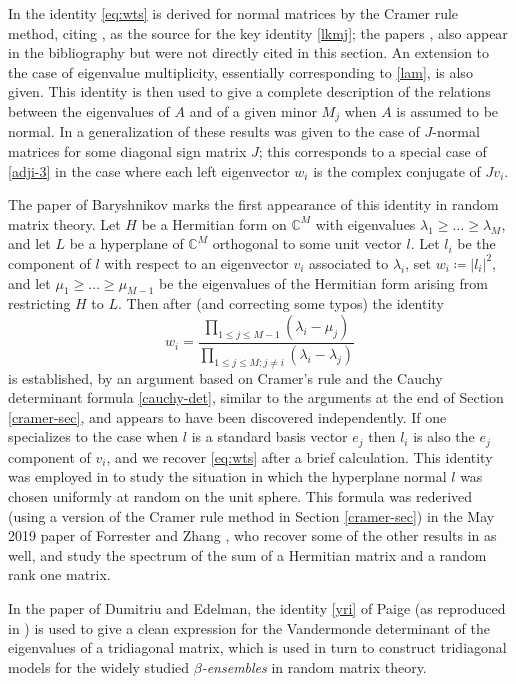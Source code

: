 \documentclass[12pt]{amsart}
\newcommand\C{\mathbb{C}}
\begin{document}
In \cite[Section 2]{NTU} the identity \eqref{eq:wts} is derived for normal matrices by the Cramer rule method, citing \cite{thompson-iv}, \cite{deutsch} as the source for the key identity \eqref{lkmj}; the papers \cite{Thompson:1966}, \cite{Thompson:1968} also appear in the bibliography but were not directly cited in this section.  An extension to the case of eigenvalue multiplicity, essentially corresponding to \eqref{lam}, is also given.  This identity is then used to give a complete description of the relations between the eigenvalues of $A$ and of a given minor $M_j$ when $A$ is assumed to be normal.  In \cite{BFdP} a generalization of these results was given to the case of $J$-normal matrices for some diagonal sign matrix $J$; this corresponds to a special case of \eqref{adji-3} in the case where each left eigenvector $w_i$ is the complex conjugate of $Jv_i$.
 
The paper of Baryshnikov \cite{Bary} marks the first appearance of this identity in random matrix theory.  Let $H$ be a Hermitian form on $\C^M$ with eigenvalues $\lambda_1 \geq \dots \geq \lambda_M$, and let $L$ be a hyperplane of $\C^M$ orthogonal to some unit vector $l$.  Let $l_i$ be the component of $l$ with respect to an eigenvector $v_i$ associated to $\lambda_i$, set $w_i \coloneqq |l_i|^2$, and let $\mu_1 \geq \dots \geq \mu_{M-1}$ be the eigenvalues of the Hermitian form arising from restricting $H$ to $L$.  Then after \cite[(4.5.2)]{Bary} (and correcting some typos) the identity
$$ w_i = \frac{\prod_{1 \leq j \leq M-1}(\lambda_i-\mu_j)}{\prod_{1 \leq j \leq M; j \neq i} (\lambda_i-\lambda_j)}$$
is established, by an argument based on Cramer's rule and the Cauchy determinant formula \eqref{cauchy-det}, similar to the arguments at the end of Section \ref{cramer-sec}, and appears to have been discovered independently.  If one specializes to the case when $l$ is a standard basis vector $e_j$ then $l_i$ is also the $e_j$ component of $v_i$, and we recover \eqref{eq:wts} after a brief calculation.  This identity was employed in \cite{Bary} to study the situation in which the hyperplane normal $l$ was chosen uniformly at random on the unit sphere.  This formula was rederived (using a version of the Cramer rule method in Section \ref{cramer-sec}) in the May 2019 paper of Forrester and Zhang \cite[(2.7)]{2019arXiv190505314F}, who recover some of the other results in \cite{Bary} as well, and study the spectrum of the sum of a Hermitian matrix and a random rank one matrix.

In the paper \cite[Lemma 2.7]{DE} of Dumitriu and Edelman, the identity \eqref{yri} of Paige (as reproduced in \cite[Theorem 7.9.2]{Parlett}) is used to give a clean expression for the Vandermonde determinant of the eigenvalues of a tridiagonal matrix, which is used in turn to construct tridiagonal models for the widely studied \emph{$\beta$-ensembles} in random matrix theory.
\end{document}
